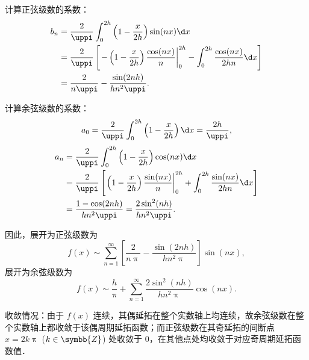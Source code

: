 \begin{solution}
    计算正弦级数的系数：
    \begin{equation}
        \begin{aligned}
            b_n & = \frac{2}{\uppi} \int_{0}^{2h} \left( 1 - \frac{x}{2h} \right) \sin(nx) \d x                                                                          \\
                & = \frac{2}{\uppi} \left[ \left. -\left( 1 - \frac{x}{2h} \right) \frac{\cos(nx)}{n} \right|_{0}^{2h} - \int_{0}^{2h} \frac{\cos(nx)}{2hn} \d x \right] \\
                & = \frac{2}{n\uppi} - \frac{\sin(2nh)}{hn^2\uppi}.
        \end{aligned}
    \end{equation}

    计算余弦级数的系数：
    \begin{equation}
        a_0 = \frac{2}{\uppi} \int_{0}^{2h} \left( 1 - \frac{x}{2h} \right) \d x = \frac{2h}{\uppi},
    \end{equation}
    \begin{equation}
        \begin{aligned}
            a_n & = \frac{2}{\uppi} \int_{0}^{2h} \left( 1 - \frac{x}{2h} \right) \cos(nx) \d x                                                                         \\
                & = \frac{2}{\uppi} \left[ \left. \left( 1 - \frac{x}{2h} \right) \frac{\sin(nx)}{n} \right|_{0}^{2h} + \int_{0}^{2h} \frac{\sin(nx)}{2hn} \d x \right] \\
                & = \frac{1 - \cos(2nh)}{hn^2\uppi} = \frac{2\sin^2(nh)}{hn^2\uppi}.
        \end{aligned}
    \end{equation}

    因此，展开为正弦级数为
    \begin{equation}
        \boxed{f(x) \sim \sum_{n=1}^{\infty} \left[ \frac{2}{n\uppi} - \frac{\sin(2nh)}{hn^2\uppi} \right] \sin(nx)},
    \end{equation}
    展开为余弦级数为
    \begin{equation}
        \boxed{f(x) \sim \frac{h}{\uppi} + \sum_{n=1}^{\infty} \frac{2\sin^2(nh)}{hn^2\uppi} \cos(nx)}.
    \end{equation}

    收敛情况：由于 $f(x)$ 连续，其偶延拓在整个实数轴上均连续，故余弦级数在整个实数轴上都收敛于该偶周期延拓函数；而正弦级数在其奇延拓的间断点 $x = 2k\uppi$ ($k \in \symbb{Z}$) 处收敛于 $0$，在其他点处均收敛于对应奇周期延拓函数值．
\end{solution}

